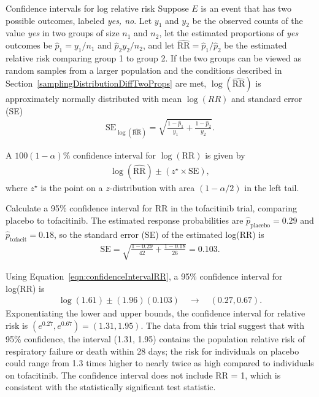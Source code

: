 \begin{onebox}{Confidence intervals for log relative risk}
  Suppose $E$ is an event that has two possible outcomes, labeled \textit{yes, no}. Let $y_1$ and $y_2$ be the observed counts of the value \textit{yes} in two groups of size $n_1$ and $n_2$, let the estimated proportions of \textit{yes} outcomes be $\hat{p}_1 = y_1/n_1$ and $\hat{p}_2 y_2/n_2$, and let $\widehat{\text{RR}} = \hat{p}_1/\hat{p}_2$ be the estimated relative risk comparing group 1 to group 2.  If the two groups can be viewed as random samples from a larger population and the conditions described in Section~\ref{samplingDistributionDiffTwoProps} are met,  $\log(\widehat{\text{RR}})$ is approximately normally distributed with mean  $\log(RR)$ and standard error (SE)
  \begin{align*}
  \text{SE}_{\log(\widehat{\text{RR}})} = \sqrt{\frac{1 - \hat{p}_1}{y_1} + \frac{1 - \hat{p}_2}{y_2}}. 
  \end{align*}

  A $100(1  - \alpha)\%$ confidence interval for $\log(\text{RR})$ is given by
\begin{align}
  \log(\widehat{\text{RR}}) \pm (z^{\star} \times \text{SE}),
  \label{eqn:confidenceIntervalRR}
\end{align}  
where $z^{\star}$ is the point on a $z$-distribution with area $(1 - \alpha/2)$ in the left tail.
\end{onebox}


\begin{examplewrap}
  \begin{nexample}{Calculate a 95\% confidence interval for RR in the tofacitinib trial, comparing placebo to tofacitinib.}
   The estimated response probabilities are $\hat{p}_{\text{placebo}} = 0.29$ and $\hat{p}_{\text{tofacit}} = 0.18$, so the standard error (SE) of the estimated log(RR) is 
 \begin{align*}
    \text{SE} = \sqrt{\frac{1 - 0.29}{42} + \frac{1 - 0.18}{26}} = 0.103. 
  \end{align*}

  Using Equation~\ref{eqn:confidenceIntervalRR}, a 95\% confidence interval for log(RR) is 
    \begin{align*}
      \log(1.61) \pm (1.96)(0.103) \quad  \to \quad (0.27, 0.67).
    \end{align*}
    Exponentiating the lower and upper bounds, the confidence interval for relative risk is $(e^{0.27}, e^{0.67}) = (1.31, 1.95)$. The data from this trial suggest that with 95\% confidence, the interval (1.31, 1.95) contains the population relative risk of respiratory failure or death within 28 days; the risk for individuals on placebo could range from 1.3 times higher to nearly twice as high compared to individuals on tofacitinib. The confidence interval does not include RR = 1, which is consistent with the statistically significant test statistic.
  \end{nexample}
\end{examplewrap}

